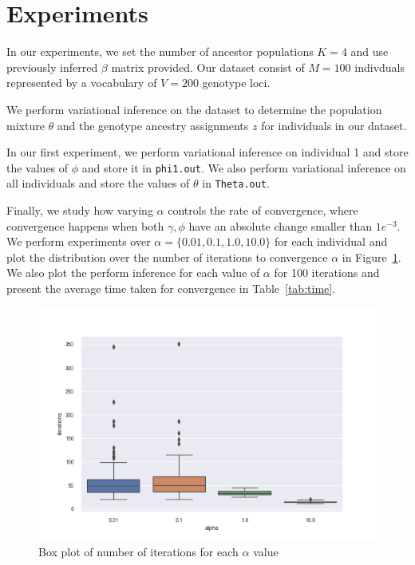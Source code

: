 \documentclass[a4paper]{article}
\begin{document}
	\section{Experiments}
	
	In our experiments, we set the number of ancestor populations $K=4$ and use previously inferred $\beta$ matrix provided. Our dataset consist of $M=100$ indivduals represented by a vocabulary of $V=200$ genotype loci. 
	
	We perform variational inference on the dataset to determine the population mixture $\theta$ and the genotype ancestry assignments $z$ for individuals in our dataset.
		
	In our first experiment, we perform variational inference on individual 1 and store the values of $\phi$ and store it in \verb|phi1.out|. We also perform variational inference on all individuals and store the values of $\theta$ in \verb|Theta.out|.
	
	Finally, we study how varying $\alpha$ controls the rate of convergence, where convergence happens when both $\gamma,\phi$ have an absolute change smaller than $1e^{-3}$. We perform experiments over $\alpha= \{0.01, 0.1, 1.0, 10.0\}$ for each individual and plot the distribution over the number of iterations to convergence $\alpha$ in Figure~\ref{fig:boxplot}. We also plot the perform inference for each value of $\alpha$ for 100 iterations and present the average time taken for convergence in Table~\ref{tab:time}.

	\begin{figure}[ht]
		\centering
		\includegraphics[width=1\linewidth]{images/iterations_boxplot.png}
		\caption{Box plot of number of iterations for each $\alpha$ value}
		\label{fig:boxplot}
	\end{figure}
	
\end{document}
